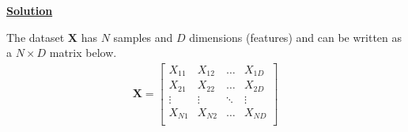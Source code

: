 \documentclass[12pt, a4paper]{article}
\begin{document}
            \vspace{1em}

            \noindent \underline{\textbf{Solution}}

            \vspace{0.25em}

            The dataset $\mathbf{X}$ has $N$ samples and $D$ dimensions (features) and can be written as a $N \times D$ matrix below.
            \begin{align*}
                \mathbf{X} =
                \begin{bmatrix}
                    X_{11} & X_{12} & \dots & X_{1D} \\
                    X_{21} & X_{22} & \dots & X_{2D} \\
                    \vdots & \vdots & \ddots & \vdots \\
                    X_{N1} & X_{N2} & \dots & X_{ND} \\
                \end{bmatrix}
            \end{align*}
\end{document}
